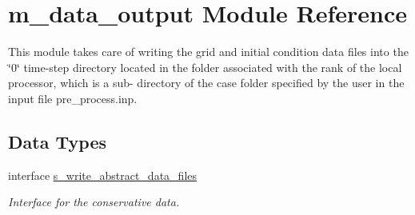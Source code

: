 \hypertarget{namespacem__data__output}{}\section{m\+\_\+data\+\_\+output Module Reference}
\label{namespacem__data__output}


This module takes care of writing the grid and initial condition data files into the \char`\"{}0\char`\"{} time-\/step directory located in the folder associated with the rank of the local processor, which is a sub-\/ directory of the case folder specified by the user in the input file pre\+\_\+process.\+inp.  


\subsection*{Data Types}
\begin{DoxyCompactItemize}
\item 
interface \hyperlink{interfacem__data__output_1_1s__write__abstract__data__files}{s\+\_\+write\+\_\+abstract\+\_\+data\+\_\+files}
\begin{DoxyCompactList}\small\item\em Interface for the conservative data. \end{DoxyCompactList}\end{DoxyCompactItemize}
